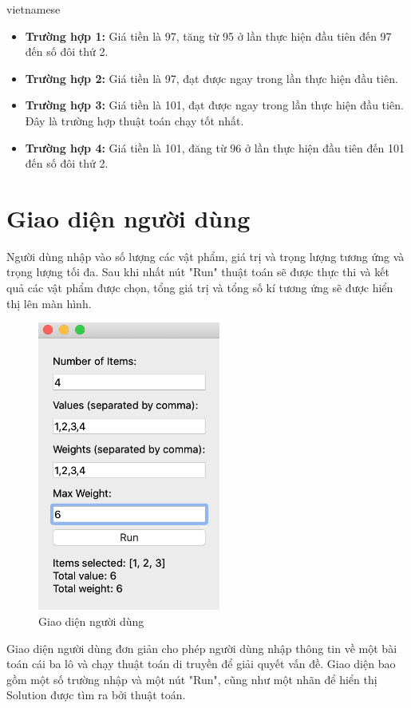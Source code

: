 \documentclass[a4paper]{article}
\begin{document}
\begin{otherlanguage*}{vietnamese}
\begin{enumerate}[leftmargin=7pt]
\begin{itemize}[leftmargin=7pt]
    \item \textbf{Trường hợp 1:} Giá tiền là 97, tăng từ 95 ở lần thực hiện đầu tiên đến 97 đến số đôi thứ 2. 
    \item \textbf{Trường hợp 2:} Giá tiền là 97, đạt được ngay trong lần thực hiện đầu tiên.
    \item \textbf{Trường hợp 3:} Giá tiền là 101, đạt được ngay trong lần thực hiện đầu tiên. Đây là trường hợp thuật toán chạy tốt nhất.
    \item \textbf{Trường hợp 4:} Giá tiền là 101, đăng từ 96 ở lần thực hiện đầu tiên đến 101 đến số đôi thứ 2. 
\end{itemize}

\section{Giao diện người dùng}

Người dùng nhập vào số lượng các vật phẩm, giá trị và trọng lượng tương ứng và trọng lượng tối đa. Sau khi nhất nút "Run" thuật toán sẽ được thực thi và kết quả các vật phẩm được chọn, tổng giá trị và tổng số kí tương ứng sẽ được hiển thị lên màn hình.

\begin{figure}[!h]
    \centering
    \includegraphics[width=6cm]{UI.png}
    \caption{Giao diện người dùng}
    \label{fig:my_label}
\end{figure}

Giao diện người dùng đơn giản cho phép người dùng nhập thông tin về một bài toán cái ba lô và chạy thuật toán di truyền để giải quyết vấn đề. Giao diện bao gồm một số trường nhập và một nút "Run", cũng như một nhãn để hiển thị Solution được tìm ra bởi thuật toán. 


\end{enumerate}
\end{otherlanguage*}
\end{document}
